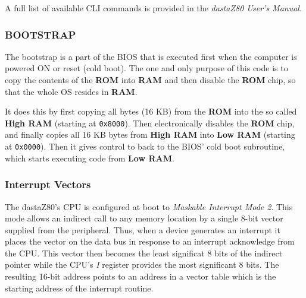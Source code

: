         A full list of available CLI commands is provided in the
        \textit{dastaZ80 User’s Manual}.

        \subsubsection{BOOTSTRAP}

        The bootstrap is a part of the BIOS that is executed first when the
        computer is powered ON or reset (cold boot). The one and only purpose of
        this code is to copy the contents of the \textbf{ROM} into \textbf{RAM}
        and then disable the \textbf{ROM} chip, so that the whole OS resides in
        \textbf{RAM}.

        It does this by first copying all bytes (16 KB) from the \textbf{ROM}
        into the so called \textbf{High RAM} (starting at \texttt{0x8000}). Then
        electronically disables the \textbf{ROM} chip, and finally copies all 16
        KB bytes from \textbf{High RAM} into \textbf{Low RAM} (starting at
        \texttt{0x0000}). Then it gives control to back to the BIOS' cold boot
        subroutine, which starts executing code from \textbf{Low RAM}.

        \subsubsection{Interrupt Vectors}

        The dastaZ80's CPU is configured at boot to \textit{Maskable Interrupt
        Mode 2}. This mode allows an indirect call to any memory location by a
        single 8-bit vector supplied from the peripheral. Thus, when a device
        generates an interrupt it places the vector on the data bus in response
        to an interrupt acknowledge from the CPU. This vector then becomes the
        least significat 8 bits of the indirect pointer while the CPU's
        \textit{I} register provides the most significant 8 bits. The resulting
        16-bit address points to an address in a vector table which is the
        starting address of the interrupt routine.

